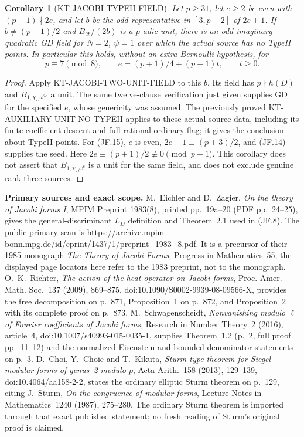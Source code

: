 \documentclass[11pt,a4paper]{article}
\newtheorem{corollary}[theorem]{Corollary}
\theoremstyle{definition}
\renewcommand{\paragraph}[1]{\par\smallskip\noindent\textbf{#1}\quad\ignorespaces}
\begin{document}
\begin{corollary}[KT-JACOBI-TYPEII-FIELD]
Let $p\geq31$, let $e\geq2$ be even with $(p-1)\nmid2e$,
and let $b$ be the odd representative in $[3,p-2]$ of $2e+1$.
If $b\ne(p-1)/2$ and $B_{2b}/(2b)$ is a $p$-adic unit,
there is an odd imaginary quadratic GD field for $N=2$, $\psi=1$
over which the actual source has no TypeII points.
In particular this holds, without an extra Bernoulli hypothesis, for
\[
 p\equiv7\pmod8,\qquad
                e=(p+1)/4+(p-1)t,\qquad t\geq0.        \tag{JF.15}
\]
\end{corollary}
\begin{proof}
Apply KT-JACOBI-TWO-UNIT-FIELD to this $b$.  Its field has
$p\nmid h(D)$ and $B_{1,\chi_D\omega^{2e}}$ a unit.
The same twelve-clause verification just given supplies GD for
the specified $e$, whose genericity was assumed.  The previously
proved KT-AUXILIARY-UNIT-NO-TYPEII applies to these actual source
data, including its finite-coefficient descent and full rational
ordinary flag; it gives the conclusion about TypeII points.
For (JF.15), $e$ is even, $2e+1\equiv(p+3)/2$, and (JF.14)
supplies the seed.  Here $2e\equiv(p+1)/2\not\equiv0\pmod{p-1}$.
This corollary does not assert that $B_{1,\chi_D\omega^e}$ is a
unit for the same field, and does not exclude genuine rank-three
sources.
\end{proof}

\paragraph{Primary sources and exact scope.}
M.~Eichler and D.~Zagier, \emph{On the theory of Jacobi forms I},
MPIM Preprint 1983(8), printed pp.~19a--20 (PDF pp.~24--25),
gives the general-discriminant $L_D$ definition and Theorem~2.1
used in (JF.8).  The public primary scan is
\url{https://archive.mpim-bonn.mpg.de/id/eprint/1437/1/preprint_1983_8.pdf}.
It is a precursor of their 1985 monograph \emph{The Theory of Jacobi
Forms}, Progress in Mathematics~55; the displayed page locators here
refer to the 1983 preprint, not to the monograph.
O.~K.~Richter, \emph{The action of the heat operator on Jacobi forms},
Proc. Amer. Math. Soc.~137 (2009), 869--875,
doi:10.1090/S0002-9939-08-09566-X, provides the free decomposition
on p.~871, Proposition~1 on p.~872, and Proposition~2 with its
complete proof on p.~873.
M.~Schwagenscheidt, \emph{Nonvanishing modulo $\ell$ of Fourier
coefficients of Jacobi forms}, Research in Number Theory~2 (2016),
article~4, doi:10.1007/s40993-015-0035-1, supplies Theorem~1.2
(p.~2, full proof pp.~11--12) and the normalized Eisenstein and
bounded-denominator statements on p.~3.
D.~Choi, Y.~Choie and T.~Kikuta, \emph{Sturm type theorem for
Siegel modular forms of genus~2 modulo $p$}, Acta Arith.~158
(2013), 129--139, doi:10.4064/aa158-2-2, states the ordinary
elliptic Sturm theorem on p.~129, citing J.~Sturm,
\emph{On the congruence of modular forms}, Lecture Notes in
Mathematics~1240 (1987), 275--280.  The ordinary Sturm theorem is
imported through that exact published statement; no fresh reading
of Sturm's original proof is claimed.
\end{document}
